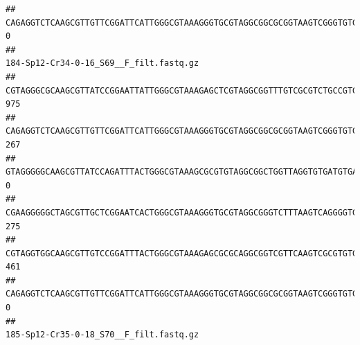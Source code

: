 \documentclass[]{article}
\begin{document}
\begin{verbatim}
## CAGAGGTCTCAAGCGTTGTTCGGATTCATTGGGCGTAAAGGGTGCGTAGGCGGCGCGGTAAGTCGGGTGTGAAATCTCGGGGCTTAACTCCGAAACTGCATTCGATACTGCCGTGCTTGAGGACTGGAGAGGAGACTGGAATTTACGGTGTAGCGGTGAAATGCGTAGATATCGTAAGGAAGACCAGTGGCGAAGGCGGGTCTCTGGACAGTTCCTGACGCTGAGGCACGAAGGCCAGGGGAGCAAACG                                       0
##                                                                                                                                                                                                                                                           184-Sp12-Cr34-0-16_S69__F_filt.fastq.gz
## CGTAGGGCGCAAGCGTTATCCGGAATTATTGGGCGTAAAGAGCTCGTAGGCGGTTTGTCGCGTCTGCCGTGAAAGTCCGGGGCTCAACTCCGGATCTGCGGTGGGTACGGGCAGACTAGAGTGATGTAGGGGAGACTGGAATTCCTGGTGTAGCGGTGAAATGCGCAGATATCAGGAGGAACACCGATGGCGAAGGCAGGTCTCTGGGCATTAACTGACGCTGAGGAGCGAAAGCATGGGGAGCGAACA                                     975
## CAGAGGTCTCAAGCGTTGTTCGGATTCATTGGGCGTAAAGGGTGCGTAGGCGGCGCGGTAAGTCGGGTGTGAAATCTCGGAGCTTAACTCCGAAACTGCATTCGATACTGCCGTGCTTGAGGACTGGAGAGGAGACTGGAATTTACGGTGTAGCGGTGAAATGCGTAGATATCGTAAGGAAGACCAGTGGCGAAGGCGGGTCTCTGGACAGTTCCTGACGCTGAGGCACGAAGGCCAGGGGAGCAAACG                                     267
## GTAGGGGGCAAGCGTTATCCAGATTTACTGGGCGTAAAGCGCGTGTAGGCGGCTGGTTAGGTGTGATGTGAAATCTTCCGGCTCAACCGGAAAACTGCATTGCAAACCGGCCTGGCTAGAGTGCAGGAGAGGGAAGCGGAATTCCAGGTGTAGCGGTGAAATGCGTAGATATCTGGAGGAACACCAGTGGCGAAGGCGGCTTCCTGGCCTGCAACTGACGCTGAGACGCGAAAGCGTGGGGAGCGAAC                                        0
## CGAAGGGGGCTAGCGTTGCTCGGAATCACTGGGCGTAAAGGGTGCGTAGGCGGGTCTTTAAGTCAGGGGTGAAATCCTGGAGCTCAACTCCAGAACTGCCTTTGATACTGAAGATCTTGAGTTCGGGAGAGGTGAGTGGAACTGCGAGTGTAGAGGTGAAATTCGTAGATATTCGCAAGAACACCAGTGGCGAAGGCGGCTCACTGGCCCGATACTGACGCTGAGGCACGAAAGCGTGGGGAGCAAACA                                     275
## CGTAGGTGGCAAGCGTTGTCCGGATTTACTGGGCGTAAAGAGCGCGCAGGCGGTCGTTCAAGTCGCGTGTGAAAGCCCCCGGCTCAACTGGGGAGGGTCACGCGATACTGATCGACTCGAAGGCAGGAGAGGGTAGTGGAATTCCCGGTGTAGTGGTGAAATGCGTAGATATCGGGAGGAACACCAGTGGCGAAGGCGACTACCTGGCCTGTTCTTGACGCTGAGGCGCGAAAGCTAGGGGAGCAAACG                                     461
## CAGAGGTCTCAAGCGTTGTTCGGATTCATTGGGCGTAAAGGGTGCGTAGGCGGCGCGGTAAGTCGGGTGTGAAATCTCGGGGCTTAACTCCGAAACTGCATTCGATACTGCCGTGCTTGAGGACTGGAGAGGAGACTGGAATTTACGGTGTAGCGGTGAAATGCGTAGATATCGTAAGGAAGACCAGTGGCGAAGGCGGGTCTCTGGACAGTTCCTGACGCTGAGGCACGAAGGCCAGGGGAGCAAACG                                       0
##                                                                                                                                                                                                                                                           185-Sp12-Cr35-0-18_S70__F_filt.fastq.gz

\end{verbatim}
\end{document}
